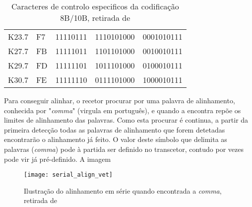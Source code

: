 \begin{table}[h!]
{\begin{tabular}{@{}lllll@{}}
			K23.7                             & F7                                       & 11110111                                       & 1110101000                                          & 0001010111                                          \\
			K27.7                             & FB                                       & 11111011                                       & 1101101000                                          & 0010010111                                          \\
			K29.7                             & FD                                       & 11111101                                       & 1011101000                                          & 0100010111                                          \\
			K30.7                             & FE                                       & 11111110                                       & 0111101000                                          & 1000010111                                          \\ \bottomrule
		\end{tabular}%
	}
	\caption{Caracteres de controlo especificos da codificação 8B/10B, retirada de \cite{R032}}
	\label{table:caracteres_especiais_8b10b}
\end{table}

Para conseguir alinhar, o recetor procurar por uma palavra de alinhamento, conhecida por "\textit{comma}" (virgula em português), e quando a encontra repõe os limites de alinhamento das palavras. Como esta procurar é continua, a partir da primeira detecção todas as palavras de alinhamento que forem detetadas encontrarão o alinhamento já feito. O valor deste símbolo que delimita as palavras (\textit{comma}) pode à partida ser definido no transcetor, contudo por vezes pode vir já pré-definido. A imagem 


\begin{figure}[h!]
	\begin{center}
		\leavevmode
		\texttt{[image: serial\_align\_vet]}
		\caption{Ilustração do alinhamento em série quando encontrada a \textit{comma}, retirada de \cite{R011}}
		\label{fig:alinhamento_serie}
	\end{center}
\end{figure}

